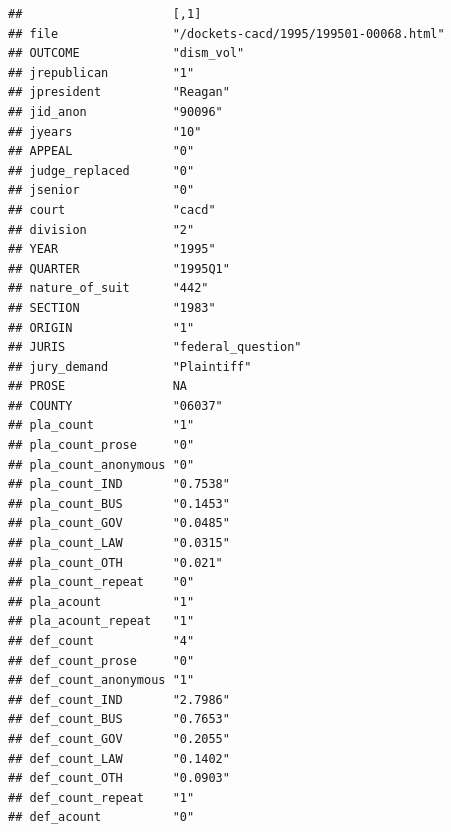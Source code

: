 \documentclass[
]{article}
\begin{document}
\begin{verbatim}
##                     [,1]                                  
## file                "/dockets-cacd/1995/199501-00068.html"
## OUTCOME             "dism_vol"                            
## jrepublican         "1"                                   
## jpresident          "Reagan"                              
## jid_anon            "90096"                               
## jyears              "10"                                  
## APPEAL              "0"                                   
## judge_replaced      "0"                                   
## jsenior             "0"                                   
## court               "cacd"                                
## division            "2"                                   
## YEAR                "1995"                                
## QUARTER             "1995Q1"                              
## nature_of_suit      "442"                                 
## SECTION             "1983"                                
## ORIGIN              "1"                                   
## JURIS               "federal_question"                    
## jury_demand         "Plaintiff"                           
## PROSE               NA                                    
## COUNTY              "06037"                               
## pla_count           "1"                                   
## pla_count_prose     "0"                                   
## pla_count_anonymous "0"                                   
## pla_count_IND       "0.7538"                              
## pla_count_BUS       "0.1453"                              
## pla_count_GOV       "0.0485"                              
## pla_count_LAW       "0.0315"                              
## pla_count_OTH       "0.021"                               
## pla_count_repeat    "0"                                   
## pla_acount          "1"                                   
## pla_acount_repeat   "1"                                   
## def_count           "4"                                   
## def_count_prose     "0"                                   
## def_count_anonymous "1"                                   
## def_count_IND       "2.7986"                              
## def_count_BUS       "0.7653"                              
## def_count_GOV       "0.2055"                              
## def_count_LAW       "0.1402"                              
## def_count_OTH       "0.0903"                              
## def_count_repeat    "1"                                   
## def_acount          "0"                                   

\end{verbatim}
\end{document}
